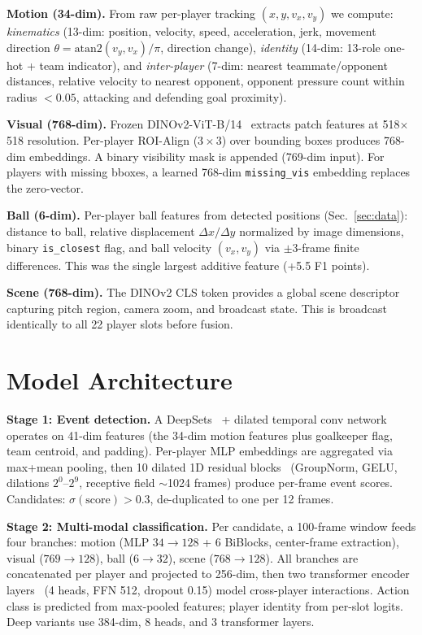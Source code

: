 \noindent\textbf{Motion (34-dim).} From raw per-player tracking $(x, y, v_x, v_y)$ we compute: \emph{kinematics} (13-dim: position, velocity, speed, acceleration, jerk, movement direction $\theta = \text{atan2}(v_y, v_x)/\pi$, direction change), \emph{identity} (14-dim: 13-role one-hot + team indicator), and \emph{inter-player} (7-dim: nearest teammate/opponent distances, relative velocity to nearest opponent, opponent pressure count within radius $< 0.05$, attacking and defending goal proximity).

\noindent\textbf{Visual (768-dim).} Frozen DINOv2-ViT-B/14~\cite{oquab2024dinov2} extracts patch features at 518$\times$518 resolution. Per-player ROI-Align ($3{\times}3$) over bounding boxes produces 768-dim embeddings. A binary visibility mask is appended (769-dim input). For players with missing bboxes, a learned 768-dim \texttt{missing\_vis} embedding replaces the zero-vector.

\noindent\textbf{Ball (6-dim).} Per-player ball features from detected positions (Sec.~\ref{sec:data}): distance to ball, relative displacement $\Delta x/\Delta y$ normalized by image dimensions, binary \texttt{is\_closest} flag, and ball velocity $(v_x, v_y)$ via $\pm$3-frame finite differences. This was the single largest additive feature (+5.5 F1 points).

\noindent\textbf{Scene (768-dim).} The DINOv2 CLS token provides a global scene descriptor capturing pitch region, camera zoom, and broadcast state. This is broadcast identically to all 22 player slots before fusion.

\section{Model Architecture}
\label{sec:model}

\noindent\textbf{Stage 1: Event detection.}
A DeepSets~\cite{zaheer2017deep} + dilated temporal conv network operates on 41-dim features (the 34-dim motion features plus goalkeeper flag, team centroid, and padding). Per-player MLP embeddings are aggregated via max+mean pooling, then 10 dilated 1D residual blocks~\cite{he2016deep} (GroupNorm, GELU, dilations $2^0$--$2^9$, receptive field $\sim$1024 frames) produce per-frame event scores. Candidates: $\sigma(\text{score}) > 0.3$, de-duplicated to one per 12 frames.

\noindent\textbf{Stage 2: Multi-modal classification.}
Per candidate, a 100-frame window feeds four branches: motion (MLP $34 \to 128$ + 6 BiBlocks, center-frame extraction), visual ($769 \to 128$), ball ($6 \to 32$), scene ($768 \to 128$). All branches are concatenated per player and projected to 256-dim, then two transformer encoder layers~\cite{vaswani2017attention} (4 heads, FFN 512, dropout 0.15) model cross-player interactions. Action class is predicted from max-pooled features; player identity from per-slot logits. Deep variants use 384-dim, 8 heads, and 3 transformer layers.


